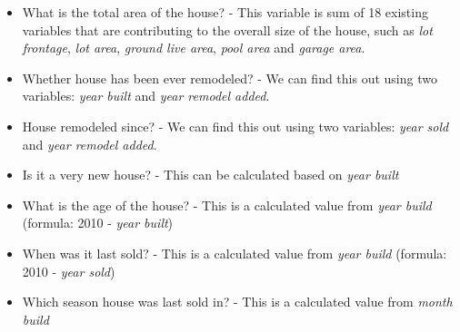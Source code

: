 \documentclass[sigconf]{acmart}
\begin{document}
	\begin{itemize} 
		\item What is the total area of the house? - This variable is sum of 18  existing variables that are contributing to the overall size of the house, such as {\em lot frontage}, {\em lot area}, {\em ground live area}, {\em pool area} and {\em garage area}. 
		\item Whether house has been ever remodeled? - We can find this out using two variables: {\em year built} and {\em year remodel added}.
		\item House remodeled since? - We can find this out using two variables: {\em year sold} and {\em year remodel added}.
		\item Is it a very new house? - This can be calculated based on {\em year built}
		\item What is the age of the house? - This is a calculated value from {\em year build} (formula: 2010 - {\em year built})
		\item When was it last sold? - This is a calculated value from {\em year build} (formula: 2010 - {\em year sold})
		\item Which season house was last sold in? - This is a calculated value from {\em month build}
	\end{itemize}
	
\end{document}
